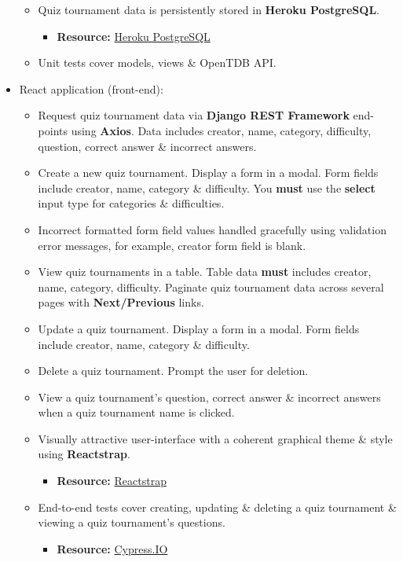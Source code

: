 \documentclass{article}
\begin{document}
\begin{itemize}
\begin{itemize}
		\item Quiz tournament data is persistently stored in \textbf{Heroku PostgreSQL}.
		\begin{itemize}
			\item \textbf{Resource:} \href{https://www.heroku.com/postgres}{Heroku PostgreSQL}
		\end{itemize}
		\item Unit tests cover models, views \& OpenTDB API.
	\end{itemize}
	\item React application (front-end):
	\begin{itemize}
		\item Request quiz tournament data via \textbf{Django REST Framework} end-points using \textbf{Axios}. Data includes creator, name, category, difficulty, question, correct answer \& incorrect answers. 
		\item Create a new quiz tournament. Display a form in a modal. Form fields include creator, name, category \& difficulty. You \textbf{must} use the \textbf{select} input type for categories \& difficulties.  
		\item Incorrect formatted form field values handled gracefully using validation error messages, for example, creator form field is blank.
		\item View quiz tournaments in a table. Table data \textbf{must} includes creator, name, category, difficulty. Paginate quiz tournament data across several pages with \textbf{Next/Previous} links.
		\item Update a quiz tournament. Display a form in a modal. Form fields include creator, name, category \& difficulty.
		\item Delete a quiz tournament. Prompt the user for deletion.
		\item View a quiz tournament's question, correct answer \& incorrect answers when a quiz tournament name is clicked. 
		\item Visually attractive user-interface with a coherent graphical theme \& style using \textbf{Reactstrap}.
		\begin{itemize}
			\item \textbf{Resource:} \href{https://reactstrap.github.io/}{Reactstrap}
		\end{itemize}
		\item End-to-end tests cover creating, updating \& deleting a quiz tournament \& viewing a quiz tournament’s questions.
		\begin{itemize}
			\item \textbf{Resource:} \href{https://docs.cypress.io/guides/overview/why-cypress.html#In-a-nutshell}{Cypress.IO}
		\end{itemize}
	\end{itemize}
\end{itemize}
\end{document}
